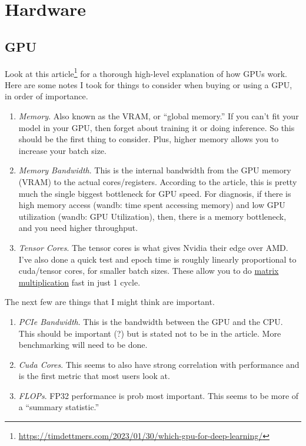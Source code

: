 \section{Hardware} 

\subsection{GPU} 

  Look at this article\footnote{\href{https://timdettmers.com/2023/01/30/which-gpu-for-deep-learning/}{https://timdettmers.com/2023/01/30/which-gpu-for-deep-learning/}} for a thorough high-level explanation of how GPUs work. Here are some notes I took for things to consider when buying or using a GPU, in order of importance. 
  \begin{enumerate}
    \item \textit{Memory}. Also known as the VRAM, or ``global memory.'' If you can't fit your model in your GPU, then forget about training it or doing inference. So this should be the first thing to consider. Plus, higher memory allows you to increase your batch size. 

    \item \textit{Memory Bandwidth}. This is the internal bandwidth from the GPU memory (VRAM) to the actual cores/registers. According to the article, this is pretty much the single biggest bottleneck for GPU speed. For diagnosis, if there is high memory access (wandb: time spent accessing memory) and low GPU utilization (wandb: GPU Utilization), then, there is a memory bottleneck, and you need higher throughput. 

    \item \textit{Tensor Cores}. The tensor cores is what gives Nvidia their edge over AMD. I've also done a quick test and epoch time is roughly linearly proportional to cuda/tensor cores, for smaller batch sizes. These allow you to do \hyperref[lin-def:matrix-multiplication]{matrix multiplication} fast in just 1 cycle. 
  \end{enumerate} 

  The next few are things that I might think are important. 
  \begin{enumerate}
    \item \textit{PCIe Bandwidth}. This is the bandwidth between the GPU and the CPU. This should be important (?) but is stated not to be in the article. More benchmarking will need to be done. 

    \item \textit{Cuda Cores}. This seems to also have strong correlation with performance and is the first metric that most users look at. 

    \item \textit{FLOPs}. FP32 performance is prob most important. This seems to be more of a ``summary statistic.''
  \end{enumerate}

